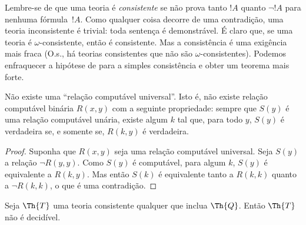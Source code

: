 \documentclass[../../../include/open-logic-section]{subfiles}
\begin{document}


\begin{explain}
Lembre-se de que uma teoria é \emph{consistente} se não prova tanto
$!A$ quanto $\lnot !A$ para nenhuma fórmula~$!A$. Como qualquer coisa
decorre de uma contradição, uma teoria inconsistente é trivial: toda
sentença é demonstrável. É claro que, se uma teoria é
$\omega$-consistente, então é consistente. Mas a consistência é uma
exigência mais fraca (O.s.\@, há teorias consistentes que não são
$\omega$-consistentes). Podemos enfraquecer a hipótese de
 para a simples consistência e obter um
teorema mais forte.
\end{explain}

\begin{lem}
Não existe uma ``relação computável universal''. Isto é, não existe
relação computável binária $R(x,y)$ com a seguinte propriedade: sempre
que $S(y)$ é uma relação computável unária, existe algum $k$ tal que,
para todo $y$, $S(y)$ é verdadeira se, e somente se, $R(k,y)$ é
verdadeira.
\end{lem}

\begin{proof}
Suponha que $R(x,y)$ seja uma relação computável universal. Seja $S(y)$
a relação $\lnot R(y,y)$. Como $S(y)$ é computável, para algum $k$,
$S(y)$ é equivalente a $R(k,y)$. Mas então $S(k)$ é equivalente tanto
a $R(k,k)$ quanto a $\lnot R(k,k)$, o que é uma contradição.
\end{proof}


\begin{thm}
Seja $\Th{T}$ uma teoria consistente qualquer que inclua $\Th{Q}$.
Então $\Th{T}$ não é decidível.
\end{thm}
\end{document}
